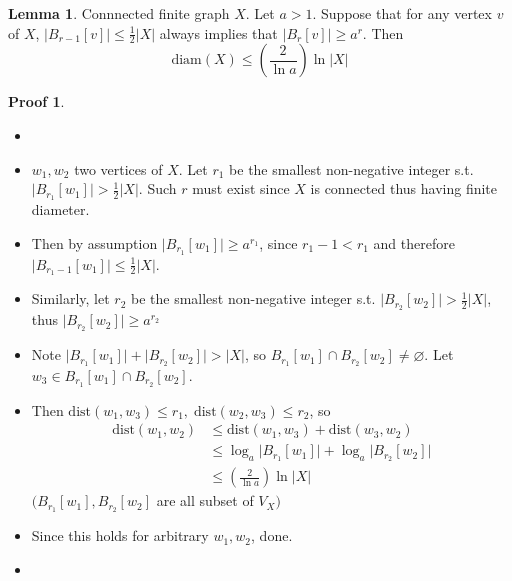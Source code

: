 \documentclass{book}
\newcommand{\diam}[1]{\textrm{diam}( #1 )}
\newcommand{\dist}[1]{\textrm{dist}( #1 )}
\newcommand{\abs}[1]{\lvert #1 \rvert }
\theoremstyle{definition}
\newtheorem{lemma}{Lemma}[chapter]
\theoremstyle{remarkstyle}
\newtheorem*{myproof}{Proof}%
\begin{document}
\begin{lemma}
    Connnected finite graph $X$. Let $a >1$. Suppose that for any vertex $v$ of $X$, $\abs{B_{r-1}[v]} \le \frac{1}{2}\abs{X}$ always implies that $\abs{B_{r}[v]}\ge a^{r} $. Then $$\diam{X}\le \left( \frac{2}{\ln a} \right) \ln \abs{X}  $$
\end{lemma}
\begin{myproof}
    \begin{itemize}
        \item[]
        \item $w_{1}, w_{2} $ two vertices of $X$. Let $r_{1} $ be the smallest non-negative integer s.t. $\abs{B_{r_{1}}[w_{1}]} > \frac{1}{2}\abs{X}$. Such $r$ must exist since $X$ is connected thus having finite diameter. 
        \item Then by assumption $\abs{B_{r_{1}}[w_{1}]} \ge a^{r_{1}} $, since $r_{1} -1 < r_{1} $ and therefore $\abs{B_{r_{1}-1}[w_{1}]} \le \frac{1}{2}\abs{X} $. 
        \item Similarly, let $r_{2} $ be the smallest non-negative integer s.t. $\abs{B_{r_{2}}[w_{2}]} > \frac{1}{2}\abs{X}$, thus $\abs{B_{r_{2}}[w_{2}]} \ge a^{r_{2}} $
        \item Note $\abs{B_{r_{1}}[w_{1}]}+\abs{B_{r_{2}}[w_{2}]}> \abs{X}$, so $B_{r_{1}}[w_{1}] \cap B_{r_{2}}[w_{2}] \ne \varnothing $. Let $w_{3} \in B_{r_{1}}[w_{1}] \cap B_{r_{2}}[w_{2}]  $. 
        \item Then $\dist{w_{1}, w_{3}}\le r_{1}, \; \dist{w_{2}, w_{3}} \le r_{2} $, so \begin{align*}
        \dist{w_{1}, w_{2}} &\le \dist{w_{1}, w_{3}} + \dist{w_{3}, w_{2}} \\
        &\le \log_{a}\abs{B_{r_{1}}[w_{1}]} + \log_{a}\abs{B_{r_{2}}[w_{2}]} \\
        &\le \left( \frac{2}{\ln a} \right) \ln\abs{X}
        \end{align*}
        $(B_{r_{1}}[w_{1}], B_{r_{2}}[w_{2}]$ are all subset of $V_{X}) $
        \item Since this holds for arbitrary $w_{1}, w_{2} $, done. 
        \item[] 
    \end{itemize}
\end{myproof}
\end{document}
